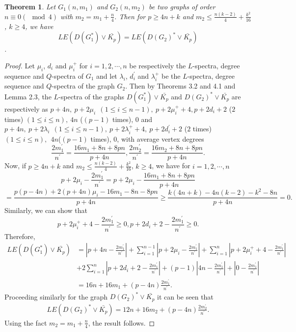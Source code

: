 \documentclass[12pt,a4paper]{amsart}
\newtheorem{theorem}{Theorem}[section]
\theoremstyle{theorem}
\theoremstyle{definition}
\numberwithin{equation}{section} \makeatletter
\begin{document}
 \begin{theorem}
 Let $G_1(n,m_1)$ and $G_2(n,m_2)$ be two graphs of order $n\equiv 0(\mod 4)$ with $m_2=m_1+\frac{n}{4}$. Then for $p\geq 4n+k$ and $m_2\leq \frac{n(k-2)}{4}+\frac{k^2}{16}$, $k\geq 4$, we have $$LE(D(G_1^*)\vee \bar{K_p})=LE(D(G_2)^*\vee \bar{K_p})$$.
 \end{theorem}
 \begin{proof}
Let $\mu_i$, $d_i$ and $\mu_i^+$ for $i=1,2,\cdots,n$ be respectively the $L$-spectra, degree sequence and $Q$-spectra of $G_1$ and let $\lambda_i$, $d_i^{\prime}$ and $\lambda_i^+$ be the $L$-spectra, degree sequence and $Q$-spectra of the graph $G_2$. Then by Theorems 3.2 and 4.1 and Lemma 2.3, the $L$-spectra of the graphs $D(G_1^*)\vee \bar{K_p}$ and $D(G_2)^*\vee \bar{K_p}$ are respectively as $p+4n,~ p+2\mu_i ~~(1\leq i\leq n-1),~ p+2\mu_i^{+}+4, p+2d_i+2$ ($2$  times) $(1\leq i\leq n), ~4n$ ($(p-1)$ times), $0$ and $p+4n,~ p+2\lambda_i ~~(1\leq i\leq n-1), ~p+2\lambda_i^{+}+4,~ p+2d_i^{\prime}+2$ ($2$ times) $(1\leq i\leq n), ~~4n $($(p-1)$ times), $0$, with average vertex degrees
$$\frac{2m_1^{\prime}}{n^{\prime}}=\frac{16m_1+8n+8pn}{p+4n} ,  \frac{2m_2^{\prime}}{n^{\prime}}=\frac{16m_2+8n+8pn}{p+4n}.$$
Now, if $p\geq 4n+k$ and $m_2\leq \frac{n(k-2)}{4}+\frac{k^2}{16}$, $k\geq 4$, we have for $i=1,2,\cdots,n$
$$p+2\mu_i-\frac{2m_1^{\prime}}{n^{\prime}}=p+2\mu_i-\frac{16m_1+8n+8pn}{p+4n}$$
$$=\frac{p(p-4n)+2(p+4n)\mu_i-16m_1-8n-8pn}{p+4n}\geq \frac{k(4n+k)-4n(k-2)-k^2-8n}{p+4n}=0.$$
Similarly, we can show that $$p+2\mu_i^{+}+4-\frac{2m_1^{\prime}}{n^{\prime}}\geq 0, p+2d_i+2-\frac{2m_1^{\prime}}{n^{\prime}}\geq 0.$$
Therefore,
\begin{align*}
LE(D(G_1^*)\vee \bar{K_p})&=|p+4n-\frac{2m_1^{\prime}}{n^{\prime}}|+\sum\limits_{i=1}^{n-1}|p+2\mu_i-\frac{2m_1^{\prime}}{n^{\prime}}|+\sum\limits_{i=1}^{n}|p+2\mu_i^{+}+4-\frac{2m_1^{\prime}}{n^{\prime}}|\\&+2\sum\limits_{i=1}^{n}|p+2d_i+2-\frac{2m_1^{\prime}}{n^{\prime}}|+(p-1)|4n-\frac{2m_1^{\prime}}{n^{\prime}}|+|0-\frac{2m_1^{\prime}}{n^{\prime}}|\\&
=16n+16m_1+(p-4n)\frac{2m_1^{\prime}}{n^{\prime}}.
\end{align*}
 Proceeding similarly for the graph $D(G_2)^*\vee \bar{K_p}$ it can be seen that
 \begin{align*}
LE(D(G_2)^*\vee \bar{K_p})=12n+16m_2+(p-4n)\frac{2m_2^{\prime}}{n^{\prime}}.
 \end{align*}
 \indent Using the fact $m_2=m_1+\frac{n}{4}$, the result follows.
\end{proof}
\end{document}
